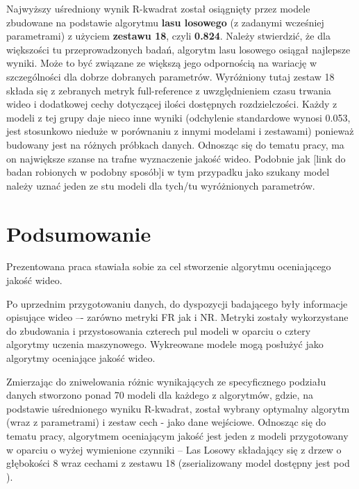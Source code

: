 Najwyższy uśredniony wynik R-kwadrat został osiągnięty przez modele zbudowane na podstawie algorytmu \textbf{lasu losowego} (z zadanymi wcześniej parametrami) z użyciem \textbf{zestawu 18}, czyli \textbf{0.824}. Należy stwierdzić, że dla większości tu przeprowadzonych badań, algorytm lasu losowego osiągał najlepsze wyniki.  Może to być związane ze większą jego odpornością na wariację  w szczególności dla dobrze dobranych parametrów. Wyróżniony tutaj zestaw 18 składa się z  zebranych metryk full-reference z uwzględnieniem czasu trwania wideo i dodatkowej cechy dotyczącej ilości dostępnych rozdzielczości. Każdy z modeli z tej grupy daje nieco inne  wyniki (odchylenie standardowe wynosi 0.053, jest stosunkowo nieduże w porównaniu z innymi modelami i zestawami) ponieważ budowany jest na różnych próbkach danych.  Odnosząc się do tematu pracy, ma on największe szanse na trafne wyznaczenie jakość wideo. Podobnie jak [link do badan robionych w podobny sposób]i w tym przypadku jako szukany model należy uznać jeden ze stu modeli dla tych/tu wyróżnionych parametrów. 



\chapter{Podsumowanie}



Prezentowana praca stawiała sobie za cel stworzenie algorytmu oceniającego jakość wideo.

Po uprzednim przygotowaniu danych, do dyspozycji badającego były informacje opisujące wideo –- zarówno metryki FR jak i NR. Metryki zostały wykorzystane do zbudowania i przystosowania czterech pul modeli w oparciu o  cztery algorytmy uczenia maszynowego. Wykreowane modele mogą posłużyć jako algorytmy oceniające jakość wideo.

Zmierzając do zniwelowania różnic wynikających ze specyficznego podziału danych stworzono ponad 70 modeli dla każdego z algorytmów, gdzie, na podstawie uśrednionego wyniku R-kwadrat, został wybrany optymalny algorytm (wraz z parametrami) i zestaw cech - jako dane wejściowe. Odnosząc się do tematu pracy, algorytmem oceniającym jakość jest jeden z modeli przygotowany w oparciu o wyżej wymienione czynniki -- Las Losowy składający się z  drzew o głębokości 8 wraz cechami z zestawu 18 (zserializowany model dostępny jest pod \cite{model_rf}).

